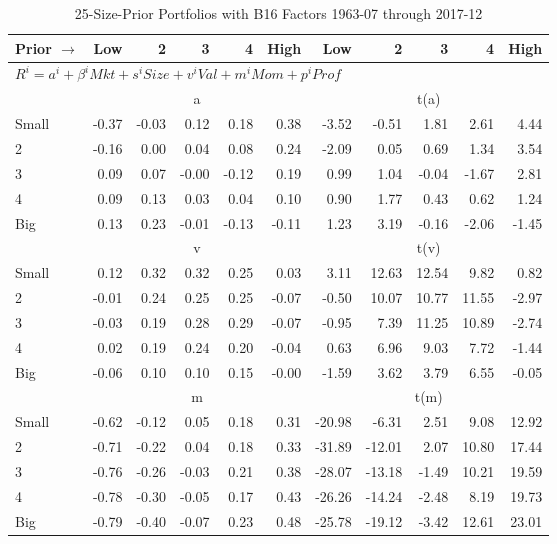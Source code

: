 
\begin{table}[H]
\footnotesize
\centering
\caption{25-Size-Prior Portfolios with B16 Factors 1963-07 through 2017-12}
\begin{tabular}{lrrrrrrrrrr}
  \toprule
    
    Prior $\rightarrow$ & Low & 2 & 3 & 4 & High & Low & 2 & 3 & 4 & High  \\ 
  \midrule
  \multicolumn{11}{l}{$R^i=a^i+\beta^iMkt+s^iSize+v^iVal+m^iMom+p^iProf$}  \\
  
     & \multicolumn{5}{c}{a} & \multicolumn{5}{c}{t(a)}   \\
     \cmidrule(r){2-6} \cmidrule(r){7-11} 
    Small  & -0.37  & -0.03  & 0.12  & 0.18  & 0.38  & -3.52  & -0.51  & 1.81  & 2.61  & 4.44   \\
    2  & -0.16  & 0.00  & 0.04  & 0.08  & 0.24  & -2.09  & 0.05  & 0.69  & 1.34  & 3.54   \\
    3  & 0.09  & 0.07  & -0.00  & -0.12  & 0.19  & 0.99  & 1.04  & -0.04  & -1.67  & 2.81   \\
    4  & 0.09  & 0.13  & 0.03  & 0.04  & 0.10  & 0.90  & 1.77  & 0.43  & 0.62  & 1.24   \\
    Big  & 0.13  & 0.23  & -0.01  & -0.13  & -0.11  & 1.23  & 3.19  & -0.16  & -2.06  & -1.45   \\
    
  
     & \multicolumn{5}{c}{v} & \multicolumn{5}{c}{t(v)}   \\
     \cmidrule(r){2-6} \cmidrule(r){7-11} 
    Small  & 0.12  & 0.32  & 0.32  & 0.25  & 0.03  & 3.11  & 12.63  & 12.54  & 9.82  & 0.82   \\
    2  & -0.01  & 0.24  & 0.25  & 0.25  & -0.07  & -0.50  & 10.07  & 10.77  & 11.55  & -2.97   \\
    3  & -0.03  & 0.19  & 0.28  & 0.29  & -0.07  & -0.95  & 7.39  & 11.25  & 10.89  & -2.74   \\
    4  & 0.02  & 0.19  & 0.24  & 0.20  & -0.04  & 0.63  & 6.96  & 9.03  & 7.72  & -1.44   \\
    Big  & -0.06  & 0.10  & 0.10  & 0.15  & -0.00  & -1.59  & 3.62  & 3.79  & 6.55  & -0.05   \\
    
  
     & \multicolumn{5}{c}{m} & \multicolumn{5}{c}{t(m)}   \\
     \cmidrule(r){2-6} \cmidrule(r){7-11} 
    Small  & -0.62  & -0.12  & 0.05  & 0.18  & 0.31  & -20.98  & -6.31  & 2.51  & 9.08  & 12.92   \\
    2  & -0.71  & -0.22  & 0.04  & 0.18  & 0.33  & -31.89  & -12.01  & 2.07  & 10.80  & 17.44   \\
    3  & -0.76  & -0.26  & -0.03  & 0.21  & 0.38  & -28.07  & -13.18  & -1.49  & 10.21  & 19.59   \\
    4  & -0.78  & -0.30  & -0.05  & 0.17  & 0.43  & -26.26  & -14.24  & -2.48  & 8.19  & 19.73   \\
    Big  & -0.79  & -0.40  & -0.07  & 0.23  & 0.48  & -25.78  & -19.12  & -3.42  & 12.61  & 23.01   \\
    

\end{tabular}
\end{table}
